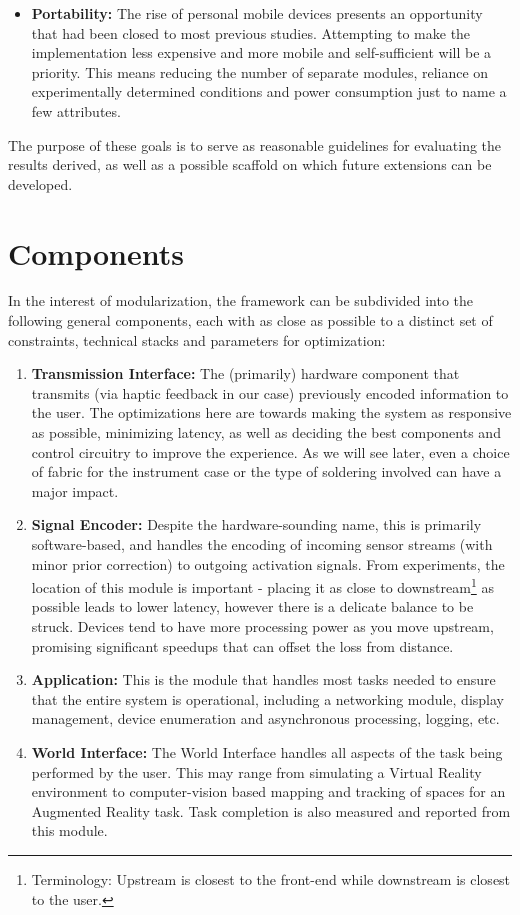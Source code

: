 \documentclass[
hidelinks,
12pt, %
oneside, %
english, %
doublespacing, %
headsepline, %
]{MastersDoctoralThesis} %
\begin{document}
\begin{itemize}
\item \textbf{Portability:} The rise of personal mobile devices presents an opportunity that had been closed to most previous studies. Attempting to make the implementation less expensive and more mobile and self-sufficient will be a priority. This means reducing the number of separate modules, reliance on experimentally determined conditions and power consumption just to name a few attributes.
\end{itemize}

The purpose of these goals is to serve as reasonable guidelines for evaluating the results derived, as well as a possible scaffold on which future extensions can be developed.

\section{Components}
\label{Components}

In the interest of modularization, the framework can be subdivided into the following general components, each with as close as possible to a distinct set of constraints, technical stacks and parameters for optimization:

\begin{enumerate}
\item \textbf{Transmission Interface:} The (primarily) hardware component that transmits (via haptic feedback in our case) previously encoded information to the user. The optimizations here are towards making the system as responsive as possible, minimizing latency, as well as deciding the best components and control circuitry to improve the experience. As we will see later, even a choice of fabric for the instrument case or the type of soldering involved can have a major impact.
\item \textbf{Signal Encoder:} Despite the hardware-sounding name, this is primarily software-based, and handles the encoding of incoming sensor streams (with minor prior correction) to outgoing activation signals. From experiments, the location of this module is important - placing it as close to downstream\footnote{Terminology: Upstream is closest to the front-end while downstream is closest to the user.} as possible leads to lower latency, however there is a delicate balance to be struck. Devices tend to have more processing power as you move upstream, promising significant speedups that can offset the loss from distance.
\item \textbf{Application:} This is the module that handles most tasks needed to ensure that the entire system is operational, including a networking module, display management, device enumeration and asynchronous processing, logging, etc.
\item \textbf{World Interface:} The World Interface handles all aspects of the task being performed by the user. This may range from simulating a Virtual Reality environment to computer-vision based mapping and tracking of spaces for an Augmented Reality task. Task completion is also measured and reported from this module.
\end{enumerate}
\end{document}
